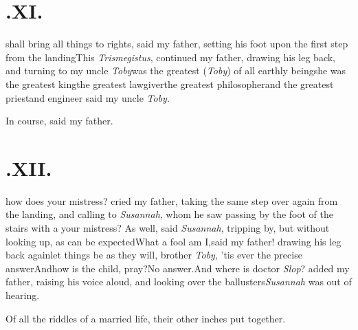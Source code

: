 \documentclass{article}
\begin{document}
\newpage
\null\smallskip
\section{.\enspace XI.}

 shall bring all things to rights, said my father, setting his foot upon
the first step from the landing\tsh This \textit{Trismegistus}, continued my father,
drawing his leg back, and turning to my uncle \textit{Toby}\tsk was the greatest
(\textit{Toby}) of all earthly beings\tsk he was the greatest king\tsk the greatest
lawgiver\tsk the greatest philosopher\tsk and the greatest
priest\tsh and engineer\tsk
said my uncle \textit{Toby}.\tsk

\tsk In course, said my father.

\vfill


\newpage\null{}\baselineskip
\section{.\enspace XII.}

 how does your mistress?\break
cried my father, taking the\break
same step over again from the landing, and calling to
\textit{Susannah}, whom he saw passing by the foot of the
stairs with a 
your mistress? As well, said \textit{Susannah}, tripping by, but
without looking up, as can be expected\tsk What a fool am
I,\break said my father! drawing his leg back again\tsk let things
be as they will, brother \textit{Toby}, ’tis ever the
precise answer\tsk And\break how is the child, pray?\tsk No
answer.\break And where is doctor \textit{Slop}?  added my\break
father, raising his voice aloud, and looking over the
ballusters\tsk \textit{Susannah} was out of hearing.

Of all the riddles of a married life,
their other inches put together.
\end{document}
